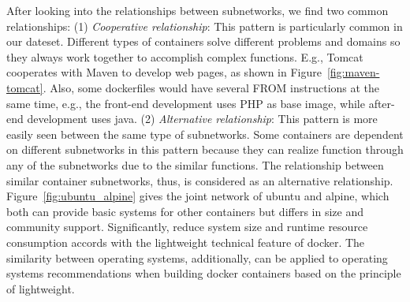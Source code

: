 \documentclass[sigconf]{acmart}
\begin{document}

After looking into the relationships between subnetworks, we find two common relationships:  %
(1) \noindent\emph{Cooperative relationship}: This pattern is particularly common in our dateset. %
Different types of containers solve different problems and domains so they always work together to accomplish complex functions. E.g., Tomcat cooperates with Maven to develop web pages, as shown in Figure~\ref{fig:maven-tomcat}.  %
Also, some dockerfiles would have several FROM instructions at the same time,  %
e.g., the front-end development uses PHP as base image, while after-end development uses java. (2) 
\emph{Alternative relationship}: This pattern is more easily seen between the same type of subnetworks. Some containers are dependent on different subnetworks in this pattern because they can realize function through any of the subnetworks due to the similar functions. The relationship between similar container subnetworks, thus, is considered as an alternative relationship.
Figure~\ref{fig:ubuntu_alpine} gives the joint network of ubuntu and alpine, which both can provide basic systems for other containers but differs in size and community support. 
Significantly, reduce system size and runtime resource consumption accords with the lightweight technical feature of docker. The similarity between operating systems, additionally, can be applied to operating systems recommendations when building docker containers based on the principle of lightweight. 
 
\end{document}
